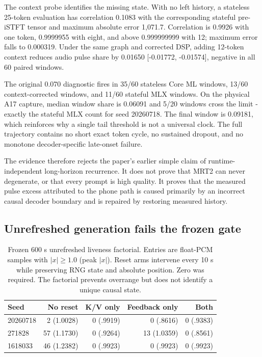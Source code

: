 \documentclass[10pt]{article}
\begin{document}
The context probe identifies the missing state. With no left history, a stateless 25-token evaluation has correlation 0.1083 with the corresponding stateful pre-iSTFT tensor and maximum absolute error 1,071.7. Correlation is 0.9926 with one token, 0.9999955 with eight, and above 0.999999999 with 12; maximum error falls to 0.000319. Under the same graph and corrected DSP, adding 12-token context reduces audio pulse share by 0.01650 [-0.01772, -0.01574], negative in all 60 paired windows.

The original 0.070 diagnostic fires in 35/60 stateless Core ML windows, 13/60 context-corrected windows, and 11/60 stateful MLX windows. On the physical A17 capture, median window share is 0.06091 and 5/20 windows cross the limit - exactly the stateful MLX count for seed 20260718. The final window is 0.09181, which reinforces why a single tail threshold is not a universal clock. The full trajectory contains no short exact token cycle, no sustained dropout, and no monotone decoder-specific late-onset failure.

The evidence therefore rejects the paper's earlier simple claim of runtime-independent long-horizon recurrence. It does not prove that MRT2 can never degenerate, or that every prompt is high quality. It proves that the measured pulse excess attributed to the phone path is caused primarily by an incorrect causal decoder boundary and is repaired by restoring measured history.

\subsection{Unrefreshed generation fails the frozen gate}

\begin{table}[H]
\centering
\small
\caption{Frozen 600 s unrefreshed liveness factorial. Entries are
float-PCM samples with $|x|\geq1.0$ (peak $|x|$). Reset arms intervene every
10 s while preserving RNG state and absolute position. Zero was required.
The factorial prevents overrange but does not identify a unique causal state.}
\label{tab:liveness}
\begin{tabular}{@{}lrrrr@{}}
\toprule
Seed & No reset & K/V only & Feedback only & Both \\
\midrule
20260718 & 2 (1.0028) & 0 (.9919) & 0 (.8616) & 0 (.9383) \\
271828   & 57 (1.1730) & 0 (.9264) & 13 (1.0359) & 0 (.8561) \\
1618033  & 46 (1.2382) & 0 (.9923) & 0 (.9923) & 0 (.9923) \\
\bottomrule
\end{tabular}
\end{table}
\end{document}
